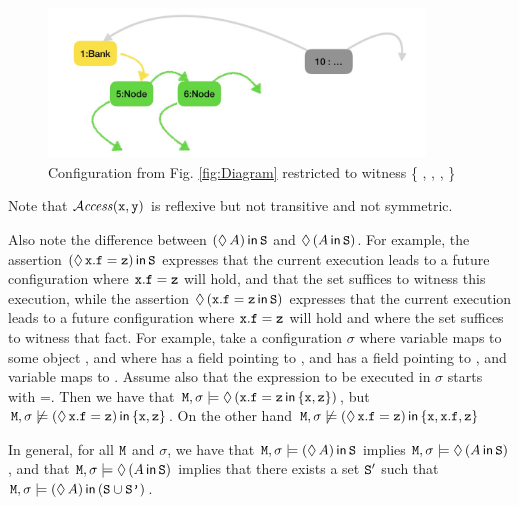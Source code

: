 \documentclass[acmsmall,screen]{acmart}
\begin{document}
\begin{figure}[btph]
\includegraphics[width=10cm,height=4cm]{diagram2}
 \caption{Configuration from Fig. \ref{fig:Diagram} restricted to witness \{ , , ,  \}}
  \label{fig:DiagramRestricted}
  \end{figure}

Note that ${\mathcal{A}}\textrm{\textit{ccess}}({\mbox{\tt{x}}},{\mbox{\tt{y}}})$ is reflexive but  not transitive and not symmetric.

Also note the difference between $(\lozenge\, A)\,{\bf{\sf {in}}}\, {\mbox{\tt{S}}}$ and $\lozenge\, (A\,{\bf{\sf {in}}}\, {\mbox{\tt{S}}})$.
For example,  the assertion  $(\lozenge\, {\mbox{\tt{x}}}.{\mbox{\tt{f}}}={\mbox{\tt{z}}})\,{\bf{\sf {in}}}\, {\mbox{\tt{S}}}$ expresses that the current execution
leads to a future configuration  where
${\mbox{\tt{x}}}.{\mbox{\tt{f}}}={\mbox{\tt{z}}}$ will hold, and that the set  suffices to witness this execution, while the assertion
$\lozenge\, ({{\mbox{\tt{x}}}.{\mbox{\tt{f}}}={\mbox{\tt{z}}}} \,{\bf{\sf {in}}}\, {\mbox{\tt{S}}})$  expresses that the current execution
leads to a future configuration   where
${\mbox{\tt{x}}}.{\mbox{\tt{f}}}={\mbox{\tt{z}}}$ will hold and where  the set  suffices to witness
that fact.
For example, take a configuration $\sigma$ where variable  maps to some object , and where  has a field 
pointing to , and  has a field 
pointing to , and variable  maps to  . Assume also that the expression to be executed in $\sigma$ starts with
=. Then we have that
${\mbox{\tt{M}}},\sigma  \models \lozenge\, ({{\mbox{\tt{x}}}.{\mbox{\tt{f}}}={\mbox{\tt{z}}}} \,{\bf{\sf {in}}}\, \{{\mbox{\tt{x}}},{\mbox{\tt{z}}}\})$,
but
${\mbox{\tt{M}}},\sigma  \not\models (\lozenge\, {\mbox{\tt{x}}}.{\mbox{\tt{f}}}={\mbox{\tt{z}}})\,{\bf{\sf {in}}}\, \{{\mbox{\tt{x}}},{\mbox{\tt{z}}}\}$.
On the other hand
${\mbox{\tt{M}}},\sigma  \not\models (\lozenge\, {\mbox{\tt{x}}}.{\mbox{\tt{f}}}={\mbox{\tt{z}}})\,{\bf{\sf {in}}}\, \{{\mbox{\tt{x}}},{\mbox{\tt{x}}}.{\mbox{\tt{f}}},{\mbox{\tt{z}}}\}$

In general, for all ${\mbox{\tt{M}}}$ and $\sigma$, we have that
 ${\mbox{\tt{M}}},\sigma \models  (\lozenge\, A)\,{\bf{\sf {in}}}\, {\mbox{\tt{S}}}$ implies ${\mbox{\tt{M}}},\sigma \models \lozenge\, (A\,{\bf{\sf {in}}}\, {\mbox{\tt{S}}})$, and that
 ${\mbox{\tt{M}}},\sigma \models \lozenge\, (A\,{\bf{\sf {in}}}\, {\mbox{\tt{S}}})$ implies that there exists a set ${\mbox{\tt{S}}}'$ such that
 ${\mbox{\tt{M}}},\sigma \models  (\lozenge\, A)\,{\bf{\sf {in}}}\, ({\mbox{\tt{S}}}\cup{\mbox{\tt{S'}}})$.
\end{document}
